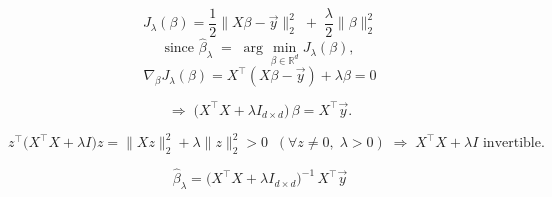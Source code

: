 
\begin{answer}
$$
J_{\lambda}(\beta)
=\frac12\lVert X\beta-\vec y\rVert_{2}^{2}
\;+\;\frac{\lambda}{2}\lVert\beta\rVert_{2}^{2}
$$
$$
\text{since }\hat{\beta}_{\lambda}\;=\;\arg\min_{\beta\in\mathbb{R}^{d}} J_{\lambda}(\beta),
$$
$$
\nabla_{\beta}J_{\lambda}(\beta)
= X^{\top}(X\beta-\vec y)+\lambda\beta=0
$$

$$
\Longrightarrow\;\bigl(X^{\top}X+\lambda I_{d\times d}\bigr)\,\beta
= X^{\top}\vec y.
$$

$$
z^{\top}\bigl(X^{\top}X+\lambda I\bigr)z
=\lVert Xz\rVert_{2}^{2}+\lambda\lVert z\rVert_{2}^{2}>0
\;\;(\forall z\ne0,\;\lambda>0)
\;\Longrightarrow\;
X^{\top}X+\lambda I \text{ invertible}.
$$

$$
\boxed{\;
\hat{\beta}_{\lambda}=
\bigl(X^{\top}X+\lambda I_{d\times d}\bigr)^{-1}\,X^{\top}\vec y
\;}
$$
\end{answer}
